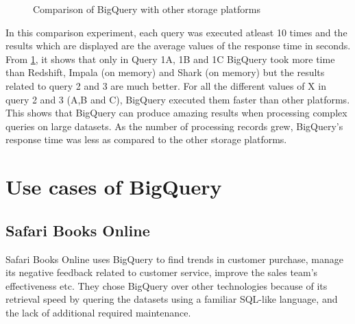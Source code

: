 \documentclass[9pt,twocolumn,twoside]{../../styles/osajnl}
\begin{document}
\begin{figure}[htbp]
\centering
{}
\caption{\cite{www-benchmarks-bigguery} Comparison of BigQuery with
  other storage platforms}
\label{fig:experiments}
\end{figure}

\noindent
In this comparison experiment, each query was executed atleast 10
times and the results which are displayed are the average values of
the response time in seconds. From \ref{fig:experiments}, it shows
that only in Query 1A, 1B and 1C BigQuery took more time than
Redshift, Impala (on memory) and Shark (on memory) but the results
related to query 2 and 3 are much better. For all the different values
of X in query 2 and 3 (A,B and C), BigQuery executed them faster than
other platforms. This shows that BigQuery can produce amazing results
when processing complex queries on large datasets. As the number of
processing records grew, BigQuery's response time was less as compared
to the other storage platforms.

\section{Use cases of BigQuery}
\subsection{Safari Books Online}
Safari Books Online\cite{www-usecase-safari} uses BigQuery to find
trends in customer purchase, manage its negative feedback related to
customer service, improve the sales team's effectiveness etc. They
chose BigQuery over other technologies because of its retrieval speed
by quering the datasets using a familiar SQL-like language, and the
lack of additional required maintenance.
\end{document}
